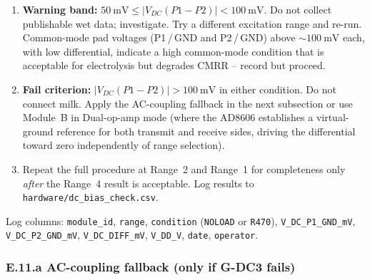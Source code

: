 \documentclass[11pt,a4paper]{article}
\begin{document}
\begin{gatebox}
\begin{enumerate}
\item \textbf{Warning band:} $\SI{50}{\milli\volt} \leq |V_{DC}(P1\!-\!P2)| < \SI{100}{\milli\volt}$. Do not collect publishable wet data; investigate. Try a different excitation range and re-run. Common-mode pad voltages (P1\,/\,GND and P2\,/\,GND) above $\sim\SI{100}{\milli\volt}$ each, with low differential, indicate a high common-mode condition that is acceptable for electrolysis but degrades CMRR -- record but proceed.
\item \textbf{Fail criterion:} $|V_{DC}(P1\!-\!P2)| > \SI{100}{\milli\volt}$ in either condition. Do not connect milk. Apply the AC-coupling fallback in the next subsection or use Module~B in Dual-op-amp mode (where the AD8606 establishes a virtual-ground reference for both transmit and receive sides, driving the differential toward zero independently of range selection).
\item Repeat the full procedure at Range~2 and Range~1 for completeness only \emph{after} the Range~4 result is acceptable. Log results to \texttt{hardware/dc\_bias\_check.csv}.
\end{enumerate}
Log columns: \texttt{module\_id}, \texttt{range}, \texttt{condition} (\texttt{NOLOAD} or \texttt{R470}), \texttt{V\_DC\_P1\_GND\_mV}, \texttt{V\_DC\_P2\_GND\_mV}, \texttt{V\_DC\_DIFF\_mV}, \texttt{V\_DD\_V}, \texttt{date}, \texttt{operator}.
\end{gatebox}

\subsubsection*{E.11.a AC-coupling fallback (only if G-DC3 fails)}
\end{document}
